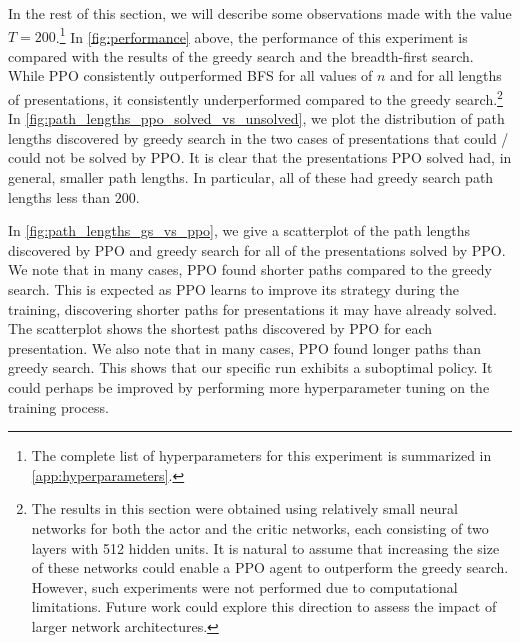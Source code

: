In the rest of this section, we will describe some observations made with the value $T=200$.\footnote{The complete list of hyperparameters for this experiment is summarized in \autoref{app:hyperparameters}.}
In \autoref{fig:performance} above, the performance of this experiment is compared with the results of the greedy search and the breadth-first search. While PPO consistently outperformed BFS for all values of $n$ and for all lengths of presentations, it consistently underperformed compared to the greedy search.\footnote{The results in this section were obtained using relatively small neural networks for both the actor and the critic networks, each consisting of two layers with 512 hidden units. It is natural to assume that increasing the size of these networks could enable a PPO agent to outperform the greedy search. However, such experiments were not performed due to computational limitations. Future work could explore this direction to assess the impact of larger network architectures.}
In \autoref{fig:path_lengths_ppo_solved_vs_unsolved}, we plot the distribution of path lengths discovered by greedy search in the two cases of presentations that could / could not be solved by PPO. It is clear that the presentations PPO solved had, in general, smaller path lengths. In particular, all of these had greedy search path lengths less than $200$.

In \autoref{fig:path_lengths_gs_vs_ppo}, we give a scatterplot of the path lengths discovered by PPO and greedy search for all of the presentations solved by PPO. We note that in many cases, PPO found shorter paths compared to the greedy search. This is expected as PPO learns to improve its strategy during the training, discovering shorter paths for presentations it may have already solved. The scatterplot shows the shortest paths discovered by PPO for each presentation. We also note that in many cases, PPO found longer paths than greedy search. This shows that our specific run exhibits a suboptimal policy. It could perhaps be improved by performing more hyperparameter tuning on the training process.

